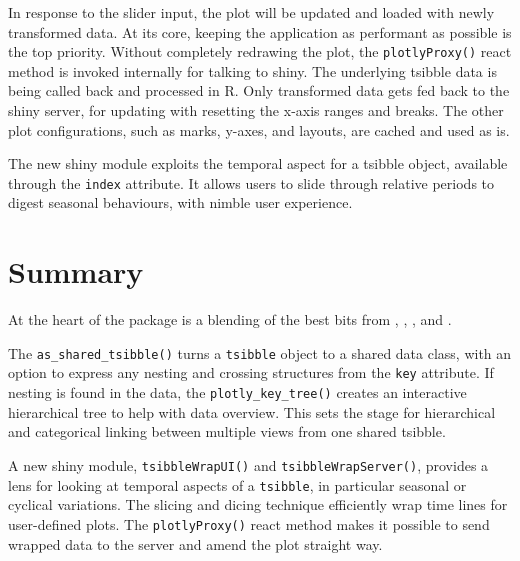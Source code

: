 In response to the slider input, the plot will be updated and loaded
with newly transformed data. At its core, keeping the application as
performant as possible is the top priority. Without completely redrawing
the plot, the \texttt{plotlyProxy()} react method is invoked internally
for talking to shiny. The underlying tsibble data is being called back
and processed in R. Only transformed data gets fed back to the shiny
server, for updating with resetting the x-axis ranges and breaks. The
other plot configurations, such as marks, y-axes, and layouts, are
cached and used as is.

The new shiny module exploits the temporal aspect for a tsibble object,
available through the \texttt{index} attribute. It allows users to slide
through relative periods to digest seasonal behaviours, with nimble user
experience.

\hypertarget{summary}{%
\section{Summary}\label{summary}}

At the heart of the  package is a blending of the
best bits from , , ,
and .

The \texttt{as\_shared\_tsibble()} turns a \texttt{tsibble} object to a
shared data class, with an option to express any nesting and crossing
structures from the \texttt{key} attribute. If nesting is found in the
data, the \texttt{plotly\_key\_tree()} creates an interactive
hierarchical tree to help with data overview. This sets the stage for
hierarchical and categorical linking between multiple views from one
shared tsibble.

A new shiny module, \texttt{tsibbleWrapUI()} and
\texttt{tsibbleWrapServer()}, provides a lens for looking at temporal
aspects of a \texttt{tsibble}, in particular seasonal or cyclical
variations. The slicing and dicing technique efficiently wrap time lines
for user-defined plots. The \texttt{plotlyProxy()} react method makes it
possible to send wrapped data to the server and amend the plot straight
way.



\address{%
Earo Wang\\
The University of Auckland\\%
Department of Statistics\\
%
%
%
\\\href{mailto:earo.wang@auckland.ac.nz}{\nolinkurl{earo.wang@auckland.ac.nz}}
}

\address{%
Dianne Cook\\
Monash University\\%
Department of Econometrics and Business Statistics\\
%
%
%
\\\href{mailto:dicook@monash.edu}{\nolinkurl{dicook@monash.edu}}
}
